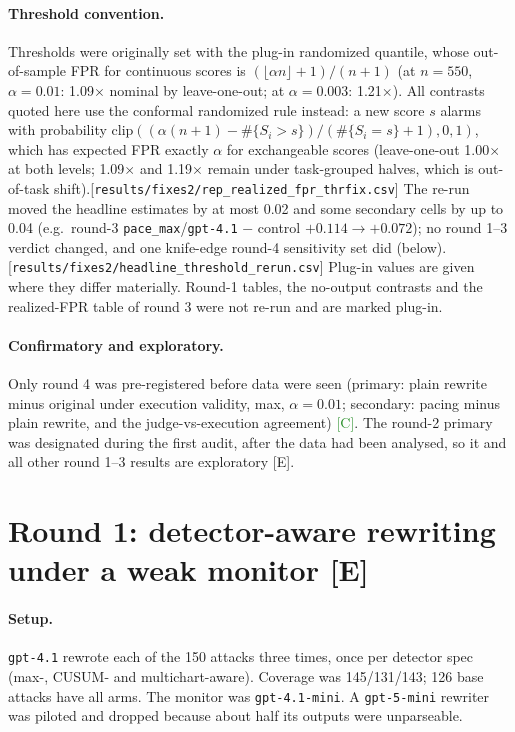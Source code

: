 \documentclass[11pt]{article}
\newcommand{\tC}{\textsf{\scriptsize\textcolor{ForestGreen}{[C]}}\xspace}
\newcommand{\tE}{\textsf{\scriptsize\textcolor{ink2}{[E]}}\xspace}
\newcommand{\src}[1]{{\footnotesize\textcolor{ink2}{[\nolinkurl{#1}]}}}
\begin{document}
\paragraph{Threshold convention.}\label{sec:thr} Thresholds were originally set with the plug-in randomized quantile, whose out-of-sample FPR for continuous scores is $(\lfloor\alpha n\rfloor+1)/(n+1)$ (at $n=550$, $\alpha=0.01$: 1.09$\times$ nominal by leave-one-out; at $\alpha=0.003$: 1.21$\times$). All contrasts quoted here use the conformal randomized rule instead: a new score $s$ alarms with probability $\mathrm{clip}((\alpha(n+1)-\#\{S_i>s\})/(\#\{S_i=s\}+1),0,1)$, which has expected FPR exactly $\alpha$ for exchangeable scores (leave-one-out 1.00$\times$ at both levels; 1.09$\times$ and 1.19$\times$ remain under task-grouped halves, which is out-of-task shift).\src{results/fixes2/rep_realized_fpr_thrfix.csv} The re-run moved the headline estimates by at most 0.02 and some secondary cells by up to 0.04 (e.g.\ round-3 \texttt{pace\_max}/\texttt{gpt-4.1} $-$ control $+0.114\to+0.072$); no round 1--3 verdict changed, and one knife-edge round-4 sensitivity set did (below).\src{results/fixes2/headline_threshold_rerun.csv} Plug-in values are given where they differ materially. Round-1 tables, the no-output contrasts and the realized-FPR table of round 3 were not re-run and are marked plug-in.

\paragraph{Confirmatory and exploratory.} Only round 4 was pre-registered before data were seen (primary: plain rewrite minus original under execution validity, max, $\alpha=0.01$; secondary: pacing minus plain rewrite, and the judge-vs-execution agreement) \tC. The round-2 primary was designated during the first audit, after the data had been analysed, so it and all other round 1--3 results are exploratory \tE.

\section{Round 1: detector-aware rewriting under a weak monitor \tE}

\paragraph{Setup.} \texttt{gpt-4.1} rewrote each of the 150 attacks three times, once per detector spec (max-, CUSUM- and multichart-aware). Coverage was 145/131/143; 126 base attacks have all arms. The monitor was \texttt{gpt-4.1-mini}. A \texttt{gpt-5-mini} rewriter was piloted and dropped because about half its outputs were unparseable.
\end{document}
